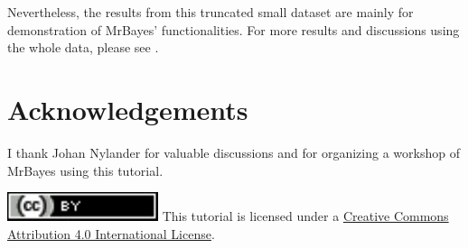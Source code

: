 \documentclass[12pt]{article}
\begin{document}
Nevertheless, the results from this truncated small dataset are mainly for demonstration of MrBayes' functionalities.
For more results and discussions using the whole data, please see \citet{Ronquist:2012ea,Zhang:2016kf}.


\section{Acknowledgements}

I thank Johan Nylander for valuable discussions and for organizing a workshop of MrBayes using this tutorial. 

\bigskip
\noindent \href{http://creativecommons.org/licenses/by/4.0/}{\includegraphics[scale=0.8]{figures/ccby.pdf}} This tutorial is licensed under a \href{http://creativecommons.org/licenses/by/4.0/}{Creative Commons Attribution 4.0 International License}. 

\newpage


\end{document}
